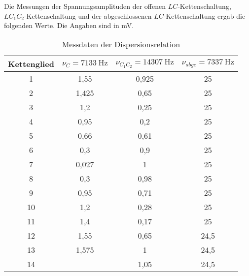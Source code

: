 Die Messungen der Spannungsamplituden der offenen $LC$-Kettenschaltung, $LC_1C_2$-Kettenschaltung
und der abgeschlossenen $LC$-Kettenschaltung ergab die folgenden Werte. Die Angaben sind
in \si{\milli\volt}.

\FloatBarrier
{}
\begin{table}
 \centering
 \begin{tabular}[width=\textwidth]{S[table-format=1.0] S S S[table-format=2.0]}
     \toprule
      {Kettenglied} & {$\nu_C=\SI{7133}{\hertz}$} & {$\nu_{C_1C_2} = \SI{14307}{\hertz}$} & {$\nu_{abge}=\SI{7337}{\hertz}$}\\
      & 1,55 & 0,925 & 25 \\
      2 & 1,425 & 0,65 & 25 \\
      3 & 1,2 & 0,25 & 25 \\
      4 & 0,95 & 0,2 & 25 \\
      5 & 0,66 & 0,61 & 25 \\
      6 & 0,3 & 0,9  & 25 \\
      7 & 0,027 & 1  & 25 \\
      8 & 0,3 & 0,98 & 25  \\
      9 & 0,95& 0,71  & 25 \\
      10 & 1,2 & 0,28 & 25 \\
      11 & 1,4 & 0,17 & 25 \\
      12 & 1,55 & 0,65 & 24,5 \\
      13 & 1,575 & 1 & 24,5 \\
    14 & \text{\,\,\,\,\,\,\,\,\,\,\,\,--} & 1,05 & 24,5 \\
      \bottomrule
\end{tabular}
  \caption{Messdaten der Dispersionsrelation}
  \label{tab:Dispersionsrelation}
\end{table}
